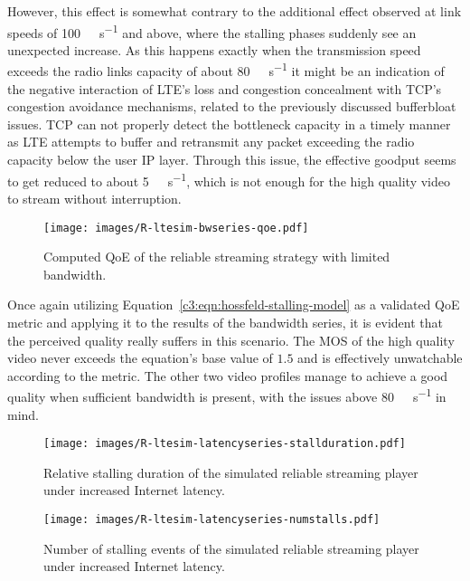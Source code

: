 However, this effect is somewhat contrary to the additional effect observed at link speeds of \SI{100}{\mega\bit\per\second} and above, where the stalling phases suddenly see an unexpected increase. As this happens exactly when the transmission speed exceeds the radio links capacity of about \SI{80}{\mega\bit\per\second} it might be an indication of the negative interaction of \gls{LTE}'s loss and congestion concealment with \gls{TCP}'s congestion avoidance mechanisms, related to the previously discussed bufferbloat issues. \gls{TCP} can not properly detect the bottleneck capacity in a timely manner as \gls{LTE} attempts to buffer and retransmit any packet exceeding the radio capacity below the user \gls{IP} layer. Through this issue, the effective goodput seems to get reduced to about \SI{5}{\mega\bit\per\second}, which is not enough for the high quality video to stream without interruption.

\begin{figure}[htb]
	\centering
	\texttt{[image: images/R-ltesim-bwseries-qoe.pdf]}
	\caption{Computed \acrshort{QoE} of the reliable streaming strategy with limited bandwidth.}
\label{c6:fig:ltesim-bwseries-qoe}
\end{figure}

Once again utilizing Equation~\ref{c3:eqn:hossfeld-stalling-model} as a validated \gls{QoE} metric and applying it to the results of the bandwidth series, it is evident that the perceived quality really suffers in this scenario. The \gls{MOS} of the high quality video never exceeds the equation's base value of $1.5$ and is effectively unwatchable according to the metric. The other two video profiles manage to achieve a good quality when sufficient bandwidth is present, with the issues above \SI{80}{\mega\bit\per\second} in mind.



\begin{figure}[htbp]
	\centering
	\texttt{[image: images/R-ltesim-latencyseries-stallduration.pdf]}
	\caption{Relative stalling duration of the simulated reliable streaming player under increased Internet latency.}
\label{c6:fig:ltesim-latencyseries-stallduration}
\end{figure}

\begin{figure}[htbp]
	\centering
	\texttt{[image: images/R-ltesim-latencyseries-numstalls.pdf]}
	\caption{Number of stalling events of the simulated reliable streaming player under increased Internet latency.}
\label{c6:fig:ltesim-latencyseries-numstalls}
\end{figure}

